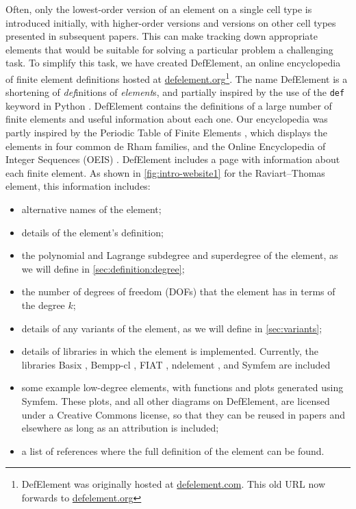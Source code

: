\documentclass[sn-mathphys-num]{sn-jnl}%
\theoremstyle{thmstyleone}%
\theoremstyle{thmstyletwo}%
\theoremstyle{thmstylethree}%
\begin{document}
Often, only the lowest-order version of an element on a single cell type is introduced initially, with higher-order
versions and versions on other cell types presented in subsequent papers. This can make tracking down
appropriate elements that would be suitable for solving a particular problem a challenging task.
To simplify this task, we have created DefElement, an online encyclopedia of finite element definitions hosted
at \href{https://defelement.org}{defelement.org}\footnote{DefElement was originally hosted at \href{https://defelement.com}{defelement.com}.
This old URL now forwards to \href{https://defelement.org}{defelement.org}}.
The name DefElement is a shortening of \emph{def}initions of \emph{element}s, and partially
inspired by the use of the \texttt{def} keyword in Python \cite{python}. DefElement contains
the definitions of a large number of finite elements and useful information about each one.
Our encyclopedia was partly inspired by the Periodic Table of Finite Elements \cite{periodic-table}, which displays the elements in four common de Rham families,
and the Online Encyclopedia of Integer Sequences (OEIS) \cite{oeis}.
DefElement includes a page with information about each finite element.
As shown in \cref{fig:intro-website1} for the Raviart--Thomas element, this information includes:
\begin{itemize}
\item alternative names of the element;
\item details of the element's definition;
\item the polynomial and Lagrange subdegree and superdegree of the element, as we will define in \cref{sec:definition:degree};
\item the number of degrees of freedom (DOFs) that the element has in terms of the degree $k$;
\item details of any variants of the element, as we will define in \cref{sec:variants};
\item details of libraries in which the element is implemented.
Currently, the libraries Basix \cite{basix}, Bempp-cl \cite{bempp-cl}, FIAT \cite{FIAT}, ndelement \cite{ndelement}, and Symfem \cite{symfem} are included
\item some example low-degree elements, with functions and plots generated using Symfem.
These plots, and all other diagrams on DefElement, are licensed under a Creative Commons license, so that they can be reused
in papers and elsewhere as long as an attribution is included;
\item a list of references where the full definition of the element can be found.
\end{itemize}
\end{document}
